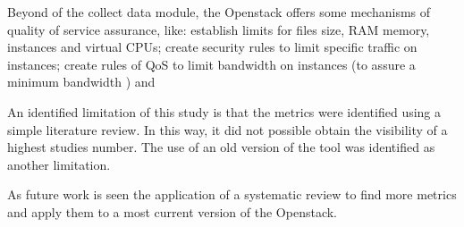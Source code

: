 \documentclass[conference]{IEEEtran}
\begin{document}
Beyond of the collect data module, the Openstack offers some mechanisms of quality of service assurance, like: establish limits for 
files size, RAM memory, instances and virtual CPUs; create security rules to limit specific traffic on instances; create rules of QoS to limit bandwidth on instances (to assure a minimum bandwidth \cite{openstack_neutron} \cite{openstack_neutron_qos}) and   


An identified limitation of this study is that the metrics were identified using a simple literature review. In this way, it did not possible obtain
the visibility of a highest studies number. The use of an old version of the tool was identified as another limitation.


As future work is seen the application of a systematic review to find more metrics and apply them to a most current version of the Openstack.






% 
% 
\end{document}
